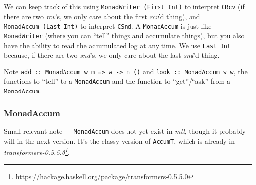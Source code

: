 \documentclass[]{article}
\newenvironment{Shaded}{}{}
\newcommand{\CommentTok}[1]{\textcolor[rgb]{0.38,0.63,0.69}{\textit{#1}}}
\newcommand{\DataTypeTok}[1]{\textcolor[rgb]{0.56,0.13,0.00}{#1}}
\newcommand{\DecValTok}[1]{\textcolor[rgb]{0.25,0.63,0.44}{#1}}
\newcommand{\FunctionTok}[1]{\textcolor[rgb]{0.02,0.16,0.49}{#1}}
\newcommand{\KeywordTok}[1]{\textcolor[rgb]{0.00,0.44,0.13}{\textbf{#1}}}
\newcommand{\NormalTok}[1]{#1}
\newcommand{\OtherTok}[1]{\textcolor[rgb]{0.00,0.44,0.13}{#1}}
\renewcommand{\href}[2]{#2\footnote{\url{#1}}}
\begin{document}
We can keep track of this using \texttt{MonadWriter\ (First\ Int)} to interpret
\texttt{CRcv} (if there are two \emph{rcv}'s, we only care about the first
\emph{rcv}'d thing), and \texttt{MonadAccum\ (Last\ Int)} to interpret
\texttt{CSnd}. A \texttt{MonadAccum} is just like \texttt{MonadWriter} (where
you can ``tell'' things and accumulate things), but you also have the ability to
read the accumulated log at any time. We use \texttt{Last\ Int} because, if
there are two \emph{snd}'s, we only care about the last \emph{snd}'d thing.

\begin{Shaded}
\end{Shaded}

Note
\texttt{add\ ::\ MonadAccum\ w\ m\ =\textgreater{}\ w\ -\textgreater{}\ m\ ()}
and \texttt{look\ ::\ MonadAccum\ w\ w}, the functions to ``tell'' to a
\texttt{MonadAccum} and the function to ``get''/``ask'' from a
\texttt{MonadAccum}.

\hypertarget{monadaccum}{%
\subsubsection{MonadAccum}\label{monadaccum}}

Small relevant note --- \texttt{MonadAccum} does not yet exist in \emph{mtl},
though it probably will in the next version. It's the classy version of
\texttt{AccumT}, which is already in
\emph{\href{https://hackage.haskell.org/package/transformers-0.5.5.0}{transformers-0.5.5.0}}.
\end{document}
